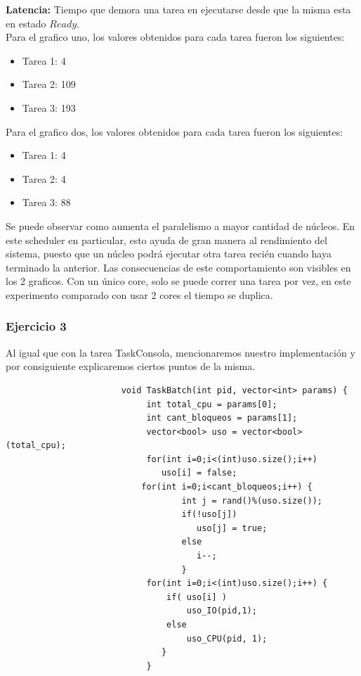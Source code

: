 \textbf{Latencia:} Tiempo que demora una tarea en ejecutarse desde que la misma esta en estado $Ready$.\\

\indent Para el grafico uno, los valores obtenidos para cada tarea fueron los siguientes:\\

\begin{itemize}
 \item Tarea 1: 4
 \item Tarea 2: 109
 \item Tarea 3: 193
\end{itemize}

\indent Para el grafico dos, los valores obtenidos para cada tarea fueron los siguientes:\\

\begin{itemize}
 \item Tarea 1: 4
 \item Tarea 2: 4
 \item Tarea 3: 88
\end{itemize}

\indent Se puede observar como aumenta el paralelismo a mayor cantidad de núcleos. 
En este scheduler en particular, esto ayuda de gran manera al rendimiento del sistema, puesto que un núcleo podrá ejecutar otra tarea 
recién cuando haya terminado la anterior. Las consecuencias de este comportamiento son visibles en los 2 graficos. Con un \'{u}nico core, 
solo se puede correr una tarea por vez, en este experimento comparado con usar 2 cores el tiempo se duplica.\\

\subsubsection[Resolución Ejercicio 3]{Ejercicio 3}

\indent Al igual que con la tarea TaskConsola, mencionaremos nuestro implementación y por consiguiente  
explicaremos ciertos puntos de la misma.\\
 \begin{verbatim}
                       void TaskBatch(int pid, vector<int> params) {
                            int total_cpu = params[0];
                            int cant_bloqueos = params[1];
                            vector<bool> uso = vector<bool>(total_cpu);
                            for(int i=0;i<(int)uso.size();i++) 
                               uso[i] = false;
	                       for(int i=0;i<cant_bloqueos;i++) {
                                   int j = rand()%(uso.size());
                                   if(!uso[j])
                                      uso[j] = true;
                                   else
                                      i--; 
                                   }
                            for(int i=0;i<(int)uso.size();i++) {
                                if( uso[i] )
                                    uso_IO(pid,1); 
                                else
                                    uso_CPU(pid, 1); 
                               }
                            }
 \end{verbatim}

